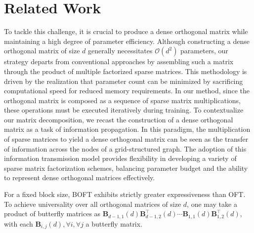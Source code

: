\section{Related Work}

To tackle this challenge, it is crucial to produce a dense orthogonal matrix while maintaining a high degree of parameter efficiency. Although constructing a dense orthogonal matrix of size $d$ generally necessitates $\mathcal{O}(d^2)$ parameters, our strategy departs from conventional approaches by assembling such a matrix through the product of multiple factorized sparse matrices. This methodology is driven by the realization that parameter count can be minimized by sacrificing computational speed for reduced memory requirements. In our method, since the orthogonal matrix is composed as a sequence of sparse matrix multiplications, these operations must be executed iteratively during training. To contextualize our matrix decomposition, we recast the construction of a dense orthogonal matrix as a task of information propagation. In this paradigm, the multiplication of sparse matrices to yield a dense orthogonal matrix can be seen as the transfer of information across the nodes of a grid-structured graph. The adoption of this information transmission model provides flexibility in developing a variety of sparse matrix factorization schemes, balancing parameter budget and the ability to represent dense orthogonal matrices effectively.

\begin{theorem}\label{thm:exp_boft}
    For a fixed block size, BOFT exhibits strictly greater expressiveness than OFT. To achieve universality over all orthogonal matrices of size $d$, one may take a product of butterfly matrices as $\bm{B}_{d-1,1}(d)\bm{B}^\top_{d-1,2}(d)\cdots\bm{B}_{1,1}(d)\bm{B}^\top_{1,2}(d)$, with each $\bm{B}_{i,j}(d),\forall i,\forall j$ a butterfly matrix.
\end{theorem}

